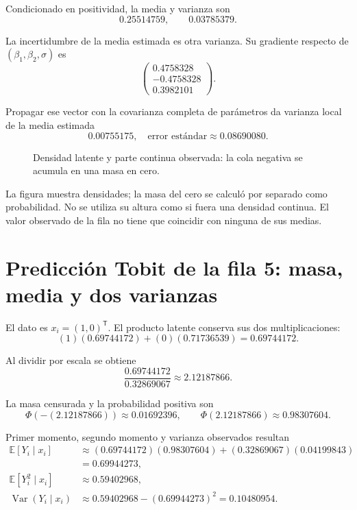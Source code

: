 \documentclass[11pt,a4paper]{article}
\newcommand{\E}{\mathbb E}
\newcommand{\T}{^{\mathsf T}}
\DeclareMathOperator{\Var}{Var}
\begin{document}
Condicionado en positividad,
la media y varianza son
\[
0.25514759,\qquad 0.03785379.
\]

La incertidumbre de la media estimada
es otra varianza.
Su gradiente respecto de
\((\beta_1,\beta_2,\sigma)\) es
\[
\begin{pmatrix}0.4758328\\-0.4758328\\0.3982101\end{pmatrix}.
\]

Propagar ese vector con la
covarianza completa de parámetros
da varianza local de la
media estimada
\[
0.00755175,\quad\text{error estándar}\approx0.08690080.
\]

\begin{figure}[H]\centering
{}
\caption{Densidad latente y parte continua observada: la cola negativa se acumula en una masa en cero.}
\end{figure}

La figura muestra densidades;
la masa del cero se calculó
por separado como probabilidad.
No se utiliza su altura
como si fuera una densidad continua.
El valor observado de la fila
no tiene que coincidir
con ninguna de sus medias.

\clearpage
\section{Predicción Tobit de la fila 5: masa, media y dos varianzas}\label{unidad116}
El dato es \(x_i=(1,0)\T\).
El producto latente conserva
sus dos multiplicaciones:
\[
(1)(0.69744172)+(0)(0.71736539)=0.69744172.
\]

Al dividir por escala se obtiene
\[
\frac{0.69744172}{0.32869067}\approx2.12187866.
\]

La masa censurada y la
probabilidad positiva son
\[
\Phi(-(2.12187866))\approx0.01692396,\qquad\Phi(2.12187866)\approx0.98307604.
\]

Primer momento, segundo momento
y varianza observados resultan
\[
\begin{aligned}
\E[Y_i\mid x_i]&\approx(0.69744172)(0.98307604)+(0.32869067)(0.04199843)\\
&=0.69944273,\\
\E[Y_i^2\mid x_i]&\approx0.59402968,\\
\Var(Y_i\mid x_i)&\approx0.59402968-(0.69944273)^2=0.10480954.\end{aligned}
\]
\end{document}
